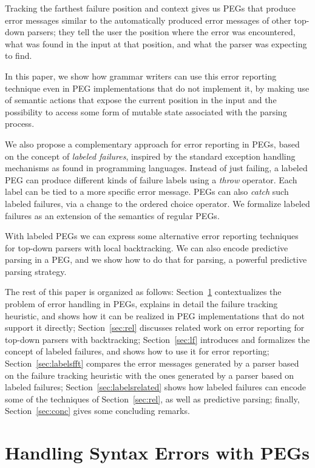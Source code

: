 \documentclass[3p,12pt,singlecolumn]{elsarticle}
\begin{document}
Tracking the farthest failure position and context
gives us PEGs that produce error messages
similar to the automatically produced error
messages of other top-down parsers; they tell
the user the position where the error was encountered,
what was found in the input at that position,
and what the parser was expecting to find.

In this paper, we show how grammar writers can use
this error reporting technique even in PEG implementations
that do not implement it, by making use of semantic
actions that expose the current position in the input
and the possibility to access some form of mutable state
associated with the parsing process. 

We also propose a complementary approach for error
reporting in PEGs, based on the concept of \emph{labeled
failures}, inspired by the standard exception handling
mechanisms as found in programming languages. Instead of just
failing, a labeled PEG can produce different kinds of failure
labels using a {\em throw} operator. Each label can be
tied to a more specific error message. PEGs can also
{\em catch} such labeled failures, via a change to
the ordered choice operator. We formalize labeled
failures as an extension of the semantics of regular
PEGs.

With labeled PEGs we can express some alternative error
reporting techniques for top-down parsers with local
backtracking. We can also encode
predictive parsing in a PEG, and we show
how to do that for  parsing, a powerful predictive
parsing strategy.

The rest of this paper is organized as follows:
Section~\ref{sec:pegs} contextualizes the problem of error
handling in PEGs, explains in detail the failure tracking
heuristic, and shows how it can be realized in PEG implementations
that do not support it directly; Section~\ref{sec:rel}
discusses related work on error reporting for top-down
parsers with backtracking;
Section~\ref{sec:lf}
introduces and formalizes the concept of labeled failures,
and shows how to use it for error reporting;
Section~\ref{sec:labelsfft} compares the error messages
generated by a parser based on the failure tracking heuristic  
with the ones generated by a parser based on labeled failures;
Section~\ref{sec:labelsrelated} shows how labeled failures
can encode some of the techniques of Section~\ref{sec:rel},
as well as predictive parsing;
finally, Section~\ref{sec:conc} gives some concluding
remarks.

\section{Handling Syntax Errors with PEGs} 
\label{sec:pegs}
\end{document}
